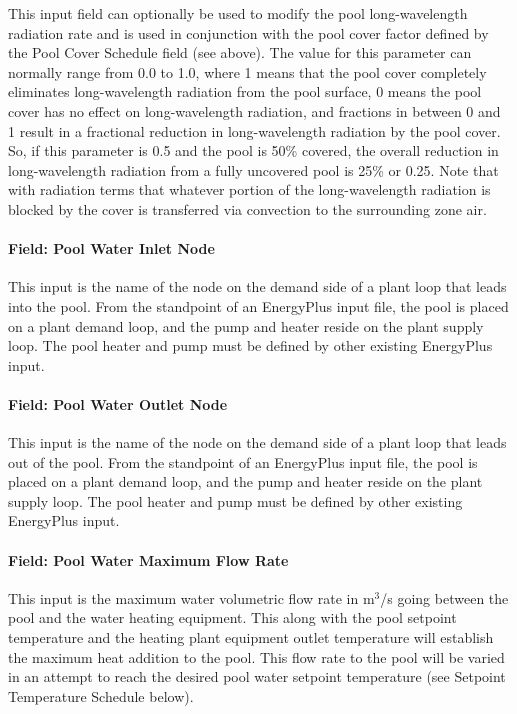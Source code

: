 This input field can optionally be used to modify the pool long-wavelength radiation rate and is used in conjunction with the pool cover factor defined by the Pool Cover Schedule field (see above). The value for this parameter can normally range from 0.0 to 1.0, where 1 means that the pool cover completely eliminates long-wavelength radiation from the pool surface, 0 means the pool cover has no effect on long-wavelength radiation, and fractions in between 0 and 1 result in a fractional reduction in long-wavelength radiation by the pool cover. So, if this parameter is 0.5 and the pool is 50\% covered, the overall reduction in long-wavelength radiation from a fully uncovered pool is 25\% or 0.25. Note that with radiation terms that whatever portion of the long-wavelength radiation is blocked by the cover is transferred via convection to the surrounding zone air.

\paragraph{Field: Pool Water Inlet Node}\label{field-pool-water-inlet-node}

This input is the name of the node on the demand side of a plant loop that leads into the pool. From the standpoint of an EnergyPlus input file, the pool is placed on a plant demand loop, and the pump and heater reside on the plant supply loop. The pool heater and pump must be defined by other existing EnergyPlus input.

\paragraph{Field: Pool Water Outlet Node}\label{field-pool-water-outlet-node}

This input is the name of the node on the demand side of a plant loop that leads out of the pool. From the standpoint of an EnergyPlus input file, the pool is placed on a plant demand loop, and the pump and heater reside on the plant supply loop. The pool heater and pump must be defined by other existing EnergyPlus input.

\paragraph{Field: Pool Water Maximum Flow Rate}\label{field-pool-water-maximum-flow-rate}

This input is the maximum water volumetric flow rate in m\(^{3}\)/s going between the pool and the water heating equipment. This along with the pool setpoint temperature and the heating plant equipment outlet temperature will establish the maximum heat addition to the pool. This flow rate to the pool will be varied in an attempt to reach the desired pool water setpoint temperature (see Setpoint Temperature Schedule below).

